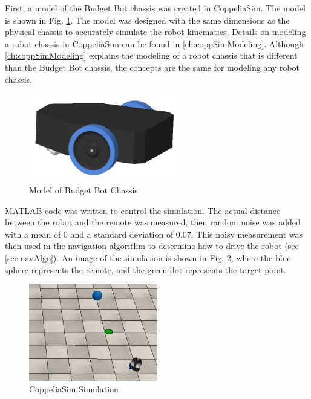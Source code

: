 \vspace*{12pt}
\noindent
First, a model of the Budget Bot chassis was created in CoppeliaSim. The model is shown in Fig. \ref{fig:budgetBotModel}. The model was designed with the same dimensions as the physical chassis to accurately simulate the robot kinematics. Details on modeling a robot chassis in CoppeliaSim can be found in \autoref{ch:coppSimModeling}. Although \autoref{ch:coppSimModeling} explains the modeling of a robot chassis that is different than the Budget Bot chassis, the concepts are the same for modeling any robot chassis.
\begin{figure}
    \centering
    \includegraphics[width=0.6\textwidth]{figs/img/budgetBotModel.png}
    \caption{Model of Budget Bot Chassis}
    \label{fig:budgetBotModel}
\end{figure}

\vspace*{12pt}
\noindent
MATLAB code was written to control the simulation. The actual distance between the robot and the remote was measured, then random noise was added with a mean of 0 and a standard deviation of 0.07. This noisy measurement was then used in the navigation algorithm to determine how to drive the robot (see \autoref{sec:navAlgo}). An image of the simulation is shown in Fig. \ref{fig:coppSimExample}, where the blue sphere represents the remote, and the green dot represents the target point.
\begin{figure}
    \centering
    \includegraphics[width=0.5\textwidth]{figs/img/coppSimExample.png}
    \caption{CoppeliaSim Simulation}
    \label{fig:coppSimExample}
\end{figure}


